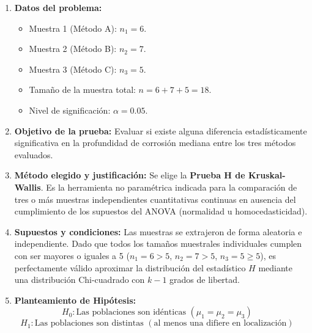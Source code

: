 \documentclass[11pt,a4paper]{article}
\begin{document}
\begin{enumerate}
    \item \textbf{Datos del problema:}
    \begin{itemize}
        \item Muestra 1 (Método A): $n_1 = 6$.
        \item Muestra 2 (Método B): $n_2 = 7$.
        \item Muestra 3 (Método C): $n_3 = 5$.
        \item Tamaño de la muestra total: $n = 6 + 7 + 5 = 18$.
        \item Nivel de significación: $\alpha = 0.05$.
    \end{itemize}

    \item \textbf{Objetivo de la prueba:}
    Evaluar si existe alguna diferencia estadísticamente significativa en la profundidad de corrosión mediana entre los tres métodos evaluados.

    \item \textbf{Método elegido y justificación:}
    Se elige la \textbf{Prueba H de Kruskal-Wallis}. Es la herramienta no paramétrica indicada para la comparación de tres o más muestras independientes cuantitativas continuas en ausencia del cumplimiento de los supuestos del ANOVA (normalidad u homocedasticidad).

    \item \textbf{Supuestos y condiciones:}
    Las muestras se extrajeron de forma aleatoria e independiente. Dado que todos los tamaños muestrales individuales cumplen con ser mayores o iguales a 5 ($n_1 = 6 > 5$, $n_2 = 7 > 5$, $n_3 = 5 \ge 5$), es perfectamente válido aproximar la distribución del estadístico $H$ mediante una distribución Chi-cuadrado con $k-1$ grados de libertad.

    \item \textbf{Planteamiento de Hipótesis:}
    \[ H_0: \text{Las poblaciones son idénticas } (\mu_1 = \mu_2 = \mu_3) \quad \]
    \[ H_1: \text{Las poblaciones son distintas } (\text{al menos una difiere en localización}) \quad \]


\end{enumerate}
\end{document}
